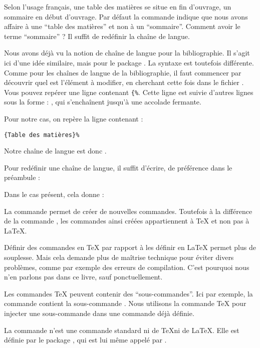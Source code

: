 Selon l'usage français, une table des matières se situe en fin d'ouvrage, un sommaire  en début d'ouvrage. Par défaut la commande  indique que nous avons affaire à une  \enquote{table des matières} et non  à un \enquote{sommaire}. Comment avoir le terme  \enquote{sommaire} ? Il suffit de redéfinir la chaîne de langue. 

Nous avons déjà vu la notion de chaîne de langue pour la bibliographie. Il s'agit ici  d'une idée similaire, mais pour le package . La syntaxe est toutefois différente. Comme pour les  chaînes de langue de la bibliographie, il faut commencer par découvrir quel est l'élément à modifier, en cherchant cette fois dans le fichier . Vous pouvez repérer une ligne contenant \verb|{%|. 
Cette ligne est suivie d'autres lignes sous la forme : , qui s'enchaînent jusqu'à une accolade fermante.

Pour notre cas, on repère la ligne contenant :

 \verb|{Table des matières}%|

Notre chaîne de langue est donc .

Pour  redéfinir une chaîne de langue, il suffit d'écrire, de préférence dans le préambule :

\begin{latexcode}
\gappto\captionsfrench{\renewcommand{<\chaine>}{Valeur}}
\end{latexcode}

Dans le cas présent, cela donne :

\begin{latexcode}
\gappto\captionsfrench{\renewcommand{\contentsname}{Sommaire}}
\end{latexcode}



\begin{plusloins}
La commande  permet de créer de nouvelles commandes. Toutefois à la différence de la commande , les commandes ainsi créées appartiennent à \TeX{} et non pas à \LaTeX{}.

Définir des commandes en \TeX{} par rapport à les définir en \LaTeX{} permet plus de souplesse. Mais cela demande plus de maîtrise technique pour éviter divers problèmes, comme par exemple des erreurs de compilation. C'est pourquoi nous n'en parlons pas dans ce livre, sauf ponctuellement.

Les commandes \TeX{} peuvent contenir des \enquote{sous-commandes}. Ici par exemple, la commande  contient la sous-commande . Nous utilisons la commande \TeX{}  pour injecter une sous-commande dans une commande déjà définie.

La commande  n'est une commande standard ni de \TeX ni de \LaTeX. Elle est définie par le package , qui est lui même appelé par .
\end{plusloins}

